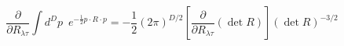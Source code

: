 \begin{equation}
    \frac{\partial}{\partial R_{{\lambda}{\tau}}}
    \int d^Dp\,\,\,
        e^{-\frac{1}{2}p\cdot R \cdot p}
    =
    -\frac{1}{2}(2\pi)^{D/2}
        \left[\frac{\partial}{\partial R_{{\lambda}{\tau}}}(\det R)\right]
        (\det R)^{-3/2}
\end{equation}

